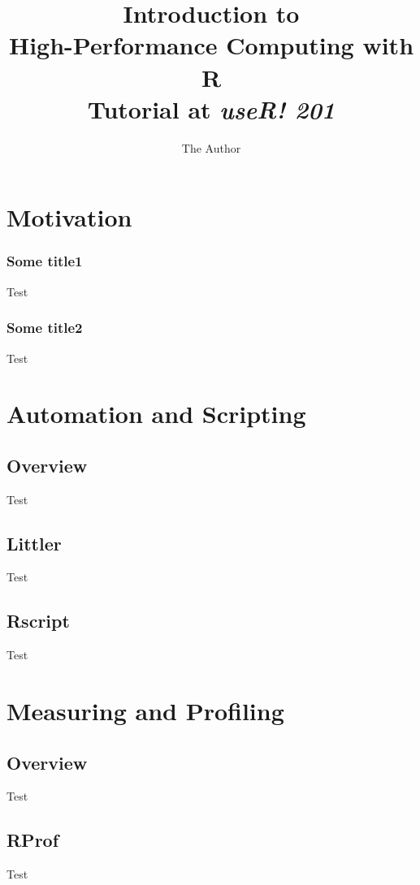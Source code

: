 \documentclass[compress]{beamer}
\title[Intro. to High-Perf. Computing ]{Introduction to\\ High-Performance Computing with R\\
\small Tutorial at \textit{useR! 201}}
\author{The Author}
\begin{document}
\begin{frame}
\maketitle
\end{frame}

\section[]{Motivation}
\begin{frame}\frametitle{Some title1}Test\end{frame}
\begin{frame}\frametitle{Some title2}Test\end{frame}

\section[Tools]{Automation and Scripting}
\subsection{Overview}
\begin{frame}Test\end{frame}
\subsection{Littler}
\begin{frame}Test\end{frame}
\subsection{Rscript}
\begin{frame}Test\end{frame}

\section[Measure]{Measuring and Profiling}
\subsection{Overview}
\begin{frame}Test\end{frame}
\subsection{RProf}
\begin{frame}Test\end{frame}
\end{document}
